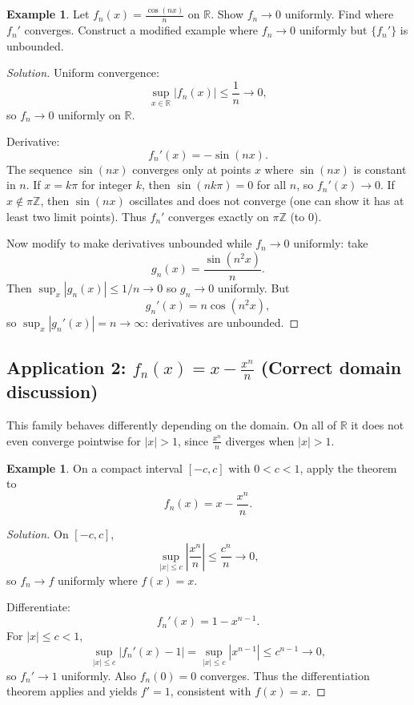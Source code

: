 \documentclass[12pt]{article}
\theoremstyle{definition}
\newtheorem{example}[theorem]{Example}
\begin{document}
\begin{example}
Let $f_n(x)=\frac{\cos(nx)}{n}$ on $\mathbb{R}$. Show $f_n\to 0$ uniformly.
Find where $f_n'$ converges. Construct a modified example where $f_n\to 0$ uniformly but $\{f_n'\}$ is unbounded.
\end{example}

\begin{proof}[Solution]
Uniform convergence:
\[
\sup_{x\in\mathbb{R}}|f_n(x)| \le \frac{1}{n}\to 0,
\]
so $f_n\to 0$ uniformly on $\mathbb{R}$.

Derivative:
\[
f_n'(x)= -\sin(nx).
\]
The sequence $\sin(nx)$ converges only at points $x$ where $\sin(nx)$ is constant in $n$.
If $x=k\pi$ for integer $k$, then $\sin(nk\pi)=0$ for all $n$, so $f_n'(x)\to 0$.
If $x\notin \pi\mathbb{Z}$, then $\sin(nx)$ oscillates and does not converge (one can show it has at least two limit points).
Thus $f_n'$ converges exactly on $\pi\mathbb{Z}$ (to $0$).

Now modify to make derivatives unbounded while $f_n\to 0$ uniformly:
take
\[
g_n(x)=\frac{\sin(n^2 x)}{n}.
\]
Then $\sup_x |g_n(x)|\le 1/n\to 0$ so $g_n\to 0$ uniformly.
But
\[
g_n'(x)= n\cos(n^2 x),
\]
so $\sup_x |g_n'(x)| = n\to \infty$: derivatives are unbounded.
\end{proof}

\subsection{Application 2: $f_n(x)=x-\frac{x^n}{n}$ (Correct domain discussion)}

This family behaves differently depending on the domain. On all of $\mathbb{R}$ it does not even converge pointwise for $|x|>1$,
since $\frac{x^n}{n}$ diverges when $|x|>1$.

\begin{example}
On a compact interval $[-c,c]$ with $0<c<1$, apply the theorem to
\[
f_n(x)=x-\frac{x^n}{n}.
\]
\end{example}

\begin{proof}[Solution]
On $[-c,c]$,
\[
\sup_{|x|\le c}\left|\frac{x^n}{n}\right| \le \frac{c^n}{n}\to 0,
\]
so $f_n\to f$ uniformly where $f(x)=x$.

Differentiate:
\[
f_n'(x)=1-x^{n-1}.
\]
For $|x|\le c<1$,
\[
\sup_{|x|\le c}|f_n'(x)-1|=\sup_{|x|\le c}|x^{n-1}|\le c^{n-1}\to 0,
\]
so $f_n'\to 1$ uniformly.
Also $f_n(0)=0$ converges. Thus the differentiation theorem applies and yields $f'=1$,
consistent with $f(x)=x$.
\end{proof}
\end{document}
